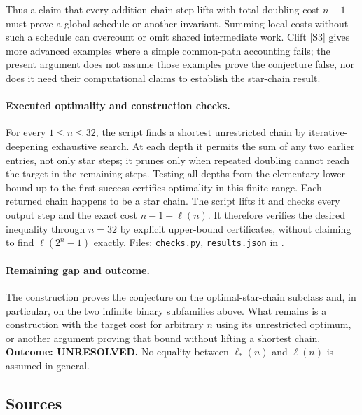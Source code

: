 \documentclass[11pt,a4paper]{article}
\begin{document}
Thus a claim that every addition-chain step lifts with total doubling
cost $n-1$ must prove a global schedule or another invariant. Summing
local costs without such a schedule can overcount or omit shared
intermediate work. Clift [S3] gives more advanced examples where a
simple common-path accounting fails; the present argument does not
assume those examples prove the conjecture false, nor does it need
their computational claims to establish the star-chain result.

\paragraph{Executed optimality and construction checks.}
For every $1\le n\le32$, the script finds a shortest unrestricted
chain by iterative-deepening exhaustive search. At each depth it permits
the sum of any two earlier entries, not only star steps; it prunes only
when repeated doubling cannot reach the target in the remaining steps.
Testing all depths from the elementary lower bound up to the first
success certifies optimality in this finite range. Each returned chain
happens to be a star chain. The script lifts it and checks every output
step and the exact cost $n-1+\ell(n)$. It therefore verifies the desired
inequality through $n=32$ by explicit upper-bound certificates, without
claiming to find $\ell(2^n-1)$ exactly.
Files: \texttt{checks.py}, \texttt{results.json} in
.

\paragraph{Remaining gap and outcome.}
The construction proves the conjecture on the optimal-star-chain
subclass and, in particular, on the two infinite binary subfamilies
above. What remains is a construction with the target cost for arbitrary
$n$ using its unrestricted optimum, or another argument proving that
bound without lifting a shortest chain. \textbf{Outcome: UNRESOLVED.}
No equality between $\ell_*(n)$ and $\ell(n)$ is assumed in general.

\subsection{Sources}
\end{document}
